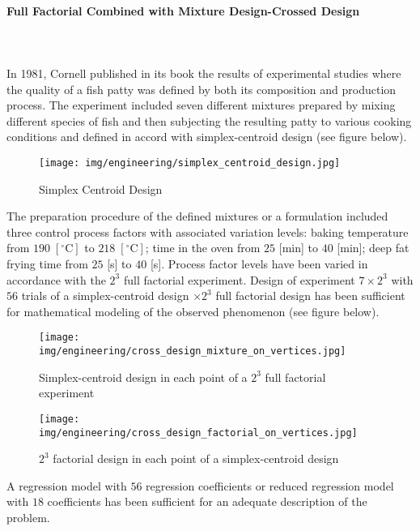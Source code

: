 	\paragraph{Full Factorial Combined with Mixture Design-Crossed Design}\mbox{}\\\\
	In 1981, Cornell\cite{cornell2011experiments} published in its book the results of experimental studies where the quality of a fish patty was defined by both its composition and production process. The experiment included seven different mixtures prepared by mixing different species of fish and then subjecting the resulting patty to various cooking conditions and defined in accord with simplex-centroid design (see figure below).
	\begin{figure}[H]
		\centering
		\texttt{[image: img/engineering/simplex\_centroid\_design.jpg]}
		\caption{Simplex Centroid Design}
	\end{figure}
	The preparation procedure of the defined mixtures or a formulation included three control process factors with associated
variation levels: baking temperature from $190\;[^\circ\text{C}]$  to $218\;[^\circ\text{C}]$; time in the oven from $25$ [min] to $40$ [min]; deep fat frying time from $25$ [s] to $40$ [s]. Process factor levels have been varied in accordance with the $2^3$ full factorial experiment. Design of experiment $7\times 2^3$ with $56$ trials of a simplex-centroid design $\times 2^3$ full factorial design
has been sufficient for mathematical modeling of the observed phenomenon (see figure below).
	\begin{figure}[H]
		\centering
		\texttt{[image: img/engineering/cross\_design\_mixture\_on\_vertices.jpg]}
		\caption{Simplex-centroid design in each point of a $2^3$ full factorial experiment}
	\end{figure}
	\begin{figure}[H]
		\centering
		\texttt{[image: img/engineering/cross\_design\_factorial\_on\_vertices.jpg]}
		\caption{$2^3$ factorial design in each point of a simplex-centroid design}
	\end{figure}
	A regression model with $56$ regression coefficients or reduced regression model with $18$ coefficients has been sufficient for an adequate description of the
problem.	
	
